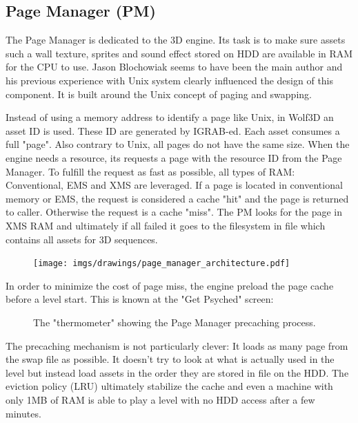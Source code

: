 \documentclass[book.tex]{subfiles}
\begin{document}
\subsection{Page Manager (PM)}
The Page Manager is dedicated to the 3D engine. Its task is to make sure assets such a wall texture, sprites and sound effect stored on HDD are available in RAM for the CPU to use. Jason Blochowiak seems to have been the main author and his previous experience with Unix system clearly influenced the design of this component. It is built around the Unix concept of paging and swapping. \\
\par
Instead of using a memory address to identify a page like Unix, in Wolf3D an asset ID is used. These ID are generated by IGRAB-ed. Each asset consumes a full "page". Also contrary to Unix, all pages do not have the same size. When the engine needs a resource, its requests a page with the resource ID from the Page Manager. To fulfill the request as fast as possible, all types of RAM: Conventional, EMS and XMS are leveraged. If a page is located in conventional memory or EMS, the request is considered a cache "hit" and the page is returned to caller. Otherwise the request is a cache "miss". The PM looks for the page in XMS RAM and ultimately if all failed it goes to the filesystem in file  which contains all assets for 3D sequences.\\
 \par
\begin{figure}[H]
\centering
 \texttt{[image: imgs/drawings/page\_manager\_architecture.pdf]}
 \end{figure}
 \par
In order to minimize the cost of page miss, the engine preload the page cache before a level start. This is known at the "Get Psyched" screen:
 \par
\begin{figure}[H]
\centering
 \caption{The "thermometer" showing the Page Manager precaching process.}
 \end{figure}
 \par
The precaching mechanism is not particularly clever: It loads as many page from the swap file as possible. It doesn't try to look at what is actually used in the level but instead load assets in the order they are stored in  file on the HDD. The eviction policy (LRU) ultimately stabilize the cache and even a machine with only 1MB of RAM is able to play a level with no HDD access after a few minutes.\\
\end{document}
